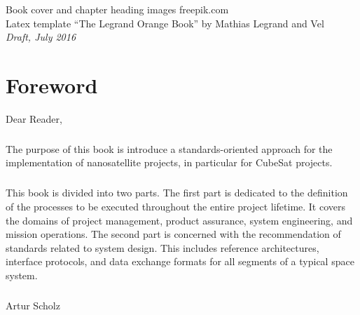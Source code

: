 \documentclass[11pt,fleqn]{book} %
\begin{document}
\noindent Book cover and chapter heading images \textcopyright freepik.com \\

\noindent Latex template ``The Legrand Orange Book'' by Mathias Legrand and Vel \\

\noindent \textit{Draft, July 2016} %


\chapter*{Foreword}

Dear Reader,

\paragraph{}

The purpose of this book is introduce a standards-oriented approach for the implementation of nanosatellite projects, in particular for CubeSat projects.  

\paragraph{}

This book is divided into two parts. The first part is dedicated to the definition of the processes to be executed throughout the entire project lifetime. It covers the domains of project management, product assurance, system engineering, and mission operations. The second part is concerned with the recommendation of standards related to system design. This includes reference architectures, interface protocols, and data exchange formats for all segments of a typical space system. 

\paragraph{}

\begin{flushright}
Artur Scholz
\end{flushright}

\end{document}
